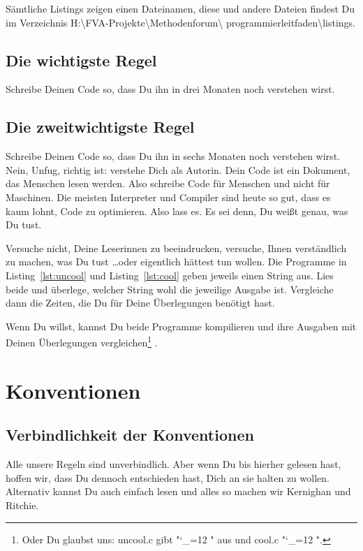 \documentclass[twoside]{scrreprt}
\providecommand{\proot}{%
H:\textbackslash{}FVA-Projekte\textbackslash{}Methodenforum\textbackslash{}%
}
\providecommand{\pdir}{\proot{}programmierleitfaden\textbackslash{}}
\begin{document}
S\"a{}mtliche Listings zeigen einen Dateinamen, diese und andere  Dateien
findest Du im Verzeichnis 
\pdir{}listings.

\section{Die wichtigste Regel\label{sec:R1}}
Schreibe Deinen Code so, dass Du ihn in drei Monaten noch verstehen wirst.

\section{Die zweitwichtigste Regel\label{sec:R2}}
Schreibe Deinen Code so, dass Du ihn in sechs Monaten noch verstehen wirst.
Nein, Unfug, richtig ist: verstehe Dich als Autorin. Dein Code ist ein Dokument,
das Menschen lesen werden. Also schreibe Code f\"u{}r Menschen und nicht f\"u{}r
Maschinen. Die meisten Interpreter und Compiler sind heute so gut, dass es
kaum lohnt, Code zu optimieren. Also lass es. Es sei denn, Du wei\ss{}t
genau, was Du tust.

Versuche nicht, Deine Leserinnen zu beeindrucken, versuche, Ihnen
verst\"a{}ndlich zu machen, was Du tust \ldots oder eigentlich h\"a{}ttest tun
wollen.
Die Programme in  Listing~\ref{lst:uncool} und Listing~\ref{lst:cool} geben
jeweils einen String aus. Lies beide und
\"u{}berlege, welcher String wohl die jeweilige Ausgabe ist. Vergleiche dann die
Zeiten, die Du f\"u{}r Deine \"U{}berlegungen ben\"o{}tigt
hast.




Wenn Du willst, kannst Du  beide Programme kompilieren und ihre Ausgaben mit
Deinen \"U{}berlegungen vergleichen\footnote{%
%
Oder Du glaubst uns: uncool.c gibt
"\catcode`_=12 \ttfamily "
aus und cool.c
"\catcode`_=12 \ttfamily ".
}%
.

\chapter{Konventionen\label{sec:conventions}}
\section{Verbindlichkeit der Konventionen\label{sec:zwang}}
Alle unsere Regeln sind unverbindlich. Aber wenn Du bis hierher gelesen hast,
hoffen wir, dass Du dennoch entschieden hast, Dich an sie halten zu wollen.
Alternativ kannst Du auch einfach \cite{KR} lesen und alles so machen wir
Kernighan und Ritchie.
\end{document}
